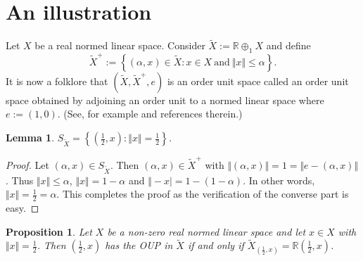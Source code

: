 \documentclass[12pt]{amsart}
\newtheorem{lemma}[theorem]{Lemma}
\newtheorem{proposition}[theorem]{Proposition}
\begin{document}
\section{An illustration}

Let $X$ be a real normed linear space. Consider $\widetilde{X} := \mathbb{R} \oplus_1 X$ and define 
$$\widetilde{X}^+ := \left\lbrace (\alpha, x) \in \widetilde{X}: x \in X ~ \mbox{and} ~ \Vert x \Vert \le \alpha \right\rbrace.$$ 
It is now a folklore that $(\widetilde{X}, \widetilde{X}^+, e)$ is an order unit space called an order unit space obtained by adjoining an order unit to a normed linear space where $e := (1, 0)$. (See, for example \cite{K21} and references therein.) 
\begin{lemma}
	$S_{\widetilde{X}} = \left\lbrace (\frac 12, x): \Vert x \Vert = \frac 12 \right\rbrace$.
\end{lemma}
\begin{proof}
	Let $(\alpha, x) \in S_{\widetilde{X}}$. Then $(\alpha, x) \in \widetilde{X}^+$ with $\Vert (\alpha, x) \Vert = 1 = \Vert e - (\alpha, x) \Vert$. Thus $\Vert x \Vert \le \alpha$, $\Vert x \Vert = 1 - \alpha$ and $\Vert - x \vert = 1 - (1 - \alpha)$. In other words, $\Vert x \Vert = \frac 12 = \alpha$. This completes the proof as the verification of the converse part is easy.
\end{proof}
\begin{proposition}\label{aoup}
	Let $X$ be a non-zero real normed linear space and let $x \in X$ with $\Vert x \Vert = \frac 12$. Then $(\frac 12, x)$ has the OUP in $\widetilde{X}$ if and only if $\tilde{X}_{(\frac 12, x)} = \mathbb{R} (\frac 12, x)$. 
\end{proposition}
\end{document}
